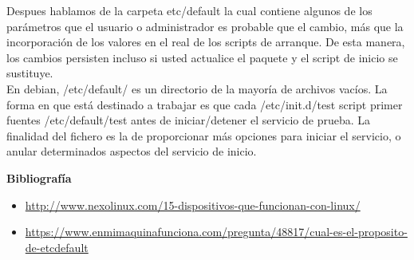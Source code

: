\documentclass[11pt, a4paper]{report}
\begin{document}
Despues hablamos de la carpeta etc/default la cual contiene algunos de los
parámetros que el usuario o administrador es probable que el cambio, más que
la incorporación de los valores en el real de los scripts de arranque. De esta
manera, los cambios persisten incluso si usted actualice el paquete y el script
de inicio se sustituye. \\

En debian, /etc/default/ es un directorio de la mayoría de archivos vacíos. La
forma en que está destinado a trabajar es que cada /etc/init.d/test script
primer fuentes /etc/default/test antes de iniciar/detener el servicio de
prueba. La finalidad del fichero es la de proporcionar más opciones para
iniciar el servicio, o anular determinados aspectos del servicio de inicio.




\newpage

\textbf{Bibliografía} \\

\begin{itemize}

\item  \url{http://www.nexolinux.com/15-dispositivos-que-funcionan-con-linux/}

\item \url{https://www.enmimaquinafunciona.com/pregunta/48817/cual-es-el-proposito-de-etcdefault}

\end{itemize}
\end{document}

